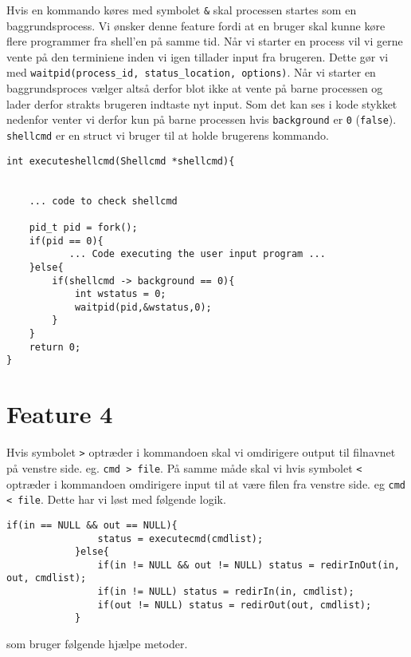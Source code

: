 \documentclass[danish]{report}
\begin{document}
Hvis en kommando køres med symbolet {\tt \&} skal processen startes som en baggrundsprocess. Vi ønsker denne feature fordi at en bruger skal kunne køre flere programmer fra shell'en på samme tid. Når vi starter en process vil vi gerne vente på den terminiene inden vi igen tillader input fra brugeren. Dette gør vi med {\tt waitpid(process_id, status_location, options)}. Når vi starter en baggrundsproces vælger altså derfor blot ikke at vente på barne processen og lader derfor strakts brugeren indtaste nyt input. Som det kan ses i kode stykket nedenfor venter vi derfor kun på barne processen hvis {\tt background} er {\tt 0} ({\tt false}). {\tt shellcmd} er en struct vi bruger til at holde brugerens kommando. 
\begin{lstlisting}
int executeshellcmd(Shellcmd *shellcmd){
    

    ... code to check shellcmd

    pid_t pid = fork();
    if(pid == 0){
           ... Code executing the user input program ...
    }else{
        if(shellcmd -> background == 0){
            int wstatus = 0;    
            waitpid(pid,&wstatus,0);
        }
    }
    return 0;
}
\end{lstlisting}

\section{Feature 4}

Hvis symbolet {\tt >} optræder i kommandoen skal vi omdirigere output til filnavnet på venstre side. eg. {\tt cmd > file}. På samme måde skal vi hvis symbolet {\tt <} optræder i kommandoen omdirigere input til at være filen fra venstre side. eg {\tt cmd < file}. Dette har vi løst med følgende logik.

\begin{lstlisting}
if(in == NULL && out == NULL){
                status = executecmd(cmdlist);
            }else{
                if(in != NULL && out != NULL) status = redirInOut(in, out, cmdlist);
                if(in != NULL) status = redirIn(in, cmdlist);
                if(out != NULL) status = redirOut(out, cmdlist);
            }
\end{lstlisting}

som bruger følgende hjælpe metoder.
\end{document}
